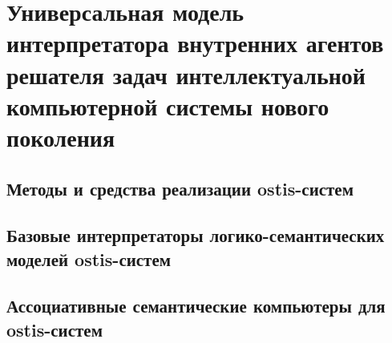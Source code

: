 \chapter{Универсальная модель интерпретатора внутренних агентов решателя задач интеллектуальной компьютерной системы нового поколения}
\label{chapter_interpreter}


\section{Методы и средства реализации ostis-систем}
\section{Базовые интерпретаторы логико-семантических моделей ostis-систем}
\section{Ассоциативные семантические компьютеры для ostis-систем}

%